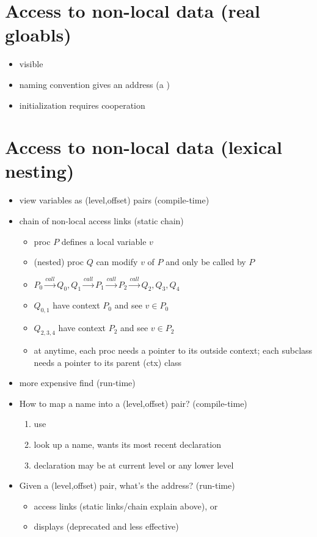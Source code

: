 \documentclass[10pt,a4paper,landscape]{article}
\begin{document}
\pagestyle{empty}

\begin{multicols*}{3}
\section*{Access to non-local data (real gloabls)}
\begin{itemize}
\item visible 
\item naming convention gives an address (a )
\item initialization requires cooperation
\end{itemize}
\section*{Access to non-local data (lexical nesting)}
\begin{itemize}
\item view variables as (\textsf{level,offset}) pairs (compile-time)
\item chain of non-local access links (static chain)
  \begin{itemize}
  \item proc $P$ defines a local variable $v$
  \item (nested) proc $Q$ can modify $v$ of $P$ and only be called by $P$
  \item $P_0\overset{call}{\to}Q_0, Q_1\overset{call}{\to}P_1\overset{call}{\to}P_2\overset{call}{\to}Q_2,Q_3,Q_4$
  \item $Q_{0,1}$ have context $P_0$ and see $v \in P_0$
  \item $Q_{2,3,4}$ have context $P_2$ and see $v \in P_2$
  \item at anytime, each proc needs a pointer to its outside context; each subclass needs a pointer to its parent (ctx) class
  \end{itemize}
\item more expensive find (run-time)
\end{itemize}
\begin{itemize}
\item How to map a name into a (level,offset) pair? (compile-time)
  \begin{enumerate}[start=0]
  \item use 
  \item look up a name, wants its most recent declaration
  \item declaration may be at current level or any lower level
  \end{enumerate}
\item Given a (level,offset) pair, what's the address? (run-time)
  \begin{itemize}
  \item access links (static links/chain explain above), or
  \item displays (deprecated and less effective)
  \end{itemize}
\end{itemize}

\end{multicols*}
\end{document}
